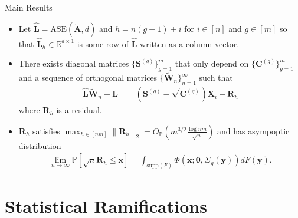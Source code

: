 \documentclass[handout]{beamer}
\newcommand{\bvar}[1]{\mathbf{#1}}
\begin{document}
\begin{frame}{Main Results}
\begin{itemize}
    \item Let $\hat{\bvar{L}} = \text{ASE}(\tilde{\bvar{A}}, d)$ and $h = n(g-1) + i$ for $i\in[n]$ and $g\in[m]$ so that $\hat{\bvar{L}}_h \in\mathbb{R}^{d\times 1}$ is some row of $\hat{\bvar{L}}$ written as a column vector.\pause
\end{itemize}
    \begin{Theorem}
    \begin{itemize} 
        \item There exists diagonal matrices $\{\bvar{S}^{(g)}\}_{g=1}^m$ that only depend on $\{\bvar{C}^{(g)}\}_{g=1}^m$ and a sequence of orthogonal matrices $\{\tilde{\bvar{W}}_n\}_{n=1}^{\infty}$ such that 
        \begin{align}
            \hat{\bvar{L}}\tilde{\bvar{W}}_n - \bvar{L} &= (\bvar{S}^{(g)} - \sqrt{\bvar{C}^{(g)}})\bvar{X}_i + \bvar{R}_h
        \end{align}
        where $\bvar{R}_h$ is a residual.\pause 
        \item  $\bvar{R}_h$ satisfies $\max_{h\in[nm]}\|\bvar{R}_h\|_2 = O_{\mathbb{P}}\left(m^{3/2}\frac{\log nm}{\sqrt{n}}\right)$ and has asympoptic distribution
        \begin{align}
            \lim_{n\to\infty}\mathbb{P}\left[\sqrt{n}\bvar{R}_h\leq \bvar{x}\right] = \int_{\text{supp}(F)}\Phi(\bvar{x}; \bvar{0}, \Sigma_g(\bvar{y}))dF(\bvar{y}). 
        \end{align}
    \end{itemize}
    \end{Theorem}
\end{frame}

\section{Statistical Ramifications}
\end{document}
